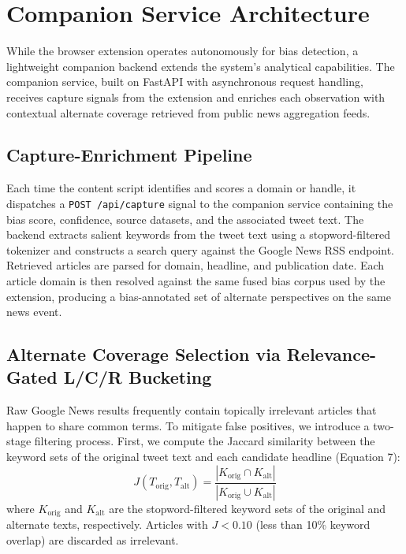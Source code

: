 \documentclass[10pt, conference, compsoc]{IEEEtran}
\begin{document}

\section{Companion Service Architecture}
While the browser extension operates autonomously for bias detection, a lightweight companion backend extends the system's analytical capabilities. The companion service, built on FastAPI with asynchronous request handling, receives capture signals from the extension and enriches each observation with contextual alternate coverage retrieved from public news aggregation feeds.

\subsection{Capture-Enrichment Pipeline}
Each time the content script identifies and scores a domain or handle, it dispatches a \texttt{POST /api/capture} signal to the companion service containing the bias score, confidence, source datasets, and the associated tweet text. The backend extracts salient keywords from the tweet text using a stopword-filtered tokenizer and constructs a search query against the Google News RSS endpoint. Retrieved articles are parsed for domain, headline, and publication date. Each article domain is then resolved against the same fused bias corpus used by the extension, producing a bias-annotated set of alternate perspectives on the same news event.

\subsection{Alternate Coverage Selection via Relevance-Gated L/C/R Bucketing}
Raw Google News results frequently contain topically irrelevant articles that happen to share common terms. To mitigate false positives, we introduce a two-stage filtering process. First, we compute the Jaccard similarity between the keyword sets of the original tweet text and each candidate headline (Equation 7):
\begin{equation}
J(T_{\text{orig}}, T_{\text{alt}}) = \frac{|K_{\text{orig}} \cap K_{\text{alt}}|}{|K_{\text{orig}} \cup K_{\text{alt}}|}
\end{equation}
where $K_{\text{orig}}$ and $K_{\text{alt}}$ are the stopword-filtered keyword sets of the original and alternate texts, respectively. Articles with $J < 0.10$ (less than 10\% keyword overlap) are discarded as irrelevant.
\end{document}
